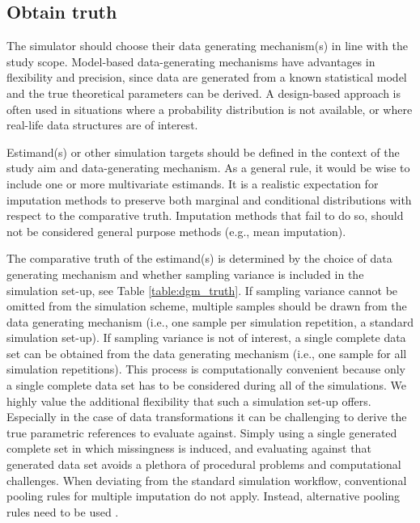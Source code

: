 \documentclass[bimj,fleqn]{w-art}
\begin{document}
\subsection{Obtain truth}


The simulator should choose their data generating mechanism(s) in line with the study scope. Model-based data-generating mechanisms have advantages in flexibility and precision, since data are generated from a known statistical model and the true theoretical parameters can be derived. A design-based approach is often used in situations where a probability distribution is not available, or where real-life data structures are of interest.  

Estimand(s) or other simulation targets should be defined in the context of the study aim and data-generating mechanism. As a general rule, it would be wise to include one or more multivariate estimands. It is a realistic expectation for imputation methods to preserve both marginal and conditional distributions with respect to the comparative truth. Imputation methods that fail to do so, should not be considered general purpose methods (e.g., mean imputation).

The comparative truth of the estimand(s) is determined by the choice of data generating mechanism and whether sampling variance is included in the simulation set-up, see Table \ref{table:dgm_truth}. If sampling variance cannot be omitted from the simulation scheme, multiple samples should be drawn from the data generating mechanism (i.e., one sample per simulation repetition, a standard simulation set-up). If sampling variance is not of interest, a single complete data set can be obtained from the data generating mechanism (i.e., one sample for all simulation repetitions). This process is computationally convenient because only a single complete data set has to be considered during all of the simulations. We highly value the additional flexibility that such a simulation set-up offers. Especially in the case of data transformations it can be challenging to derive the true parametric references to evaluate against. Simply using a single generated complete set in which missingness is induced, and evaluating against that generated data set avoids a plethora of procedural problems and computational challenges.
When deviating from the standard simulation workflow, conventional pooling rules for multiple imputation \citep[cf.][p. 76-77]{rubi87} do not apply. Instead, alternative pooling rules need to be used \citep{raghunathan2003multiple,vink14}.
\end{document}

